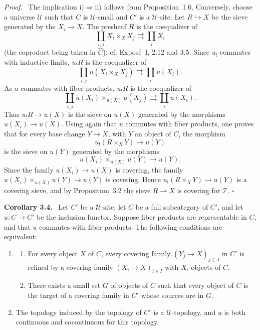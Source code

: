 \documentclass[11pt]{article}
\newcommand{\U}{\mathcal{U}}
\newcommand{\qedtext}{\hfill\(\square\)}
\newenvironment{statement}[1]{\par\medskip\noindent\textbf{#1.}\ }{\par\medskip}
\newenvironment{prooftext}{\par\noindent\emph{Proof.}\ }{\par\medskip}
\begin{document}
\begin{prooftext}
The implication \(\mathrm{i})\Rightarrow\mathrm{ii})\) follows from Proposition~1.6. Conversely, choose a universe \(\U\) such that \(C\) is \(\U\)-small and \(C'\) is a \(\U\)-site. Let \(R\hookrightarrow X\) be the sieve generated by the \(X_i\to X\). The presheaf \(R\) is the coequalizer of
\[
\coprod_{i,j}X_i\times_XX_j\rightrightarrows\coprod_iX_i
\]
(the coproduct being taken in \(\widehat C\)); cf. Expos\'e~I, 2.12 and 3.5. Since \(u_!\) commutes with inductive limits, \(u_!R\) is the coequalizer of
\[
\coprod_{i,j}u(X_i\times_XX_j)\rightrightarrows\coprod_i u(X_i).
\]
As \(u\) commutes with fiber products, \(u_!R\) is the coequalizer of
\[
\coprod_{i,j}u(X_i)\times_{u(X)}u(X_j)\rightrightarrows\coprod_i u(X_i).
\]
Thus \(u_!R\to u(X)\) is the sieve on \(u(X)\) generated by the morphisms \(u(X_i)\to u(X)\). Using again that \(u\) commutes with fiber products, one proves that for every base change \(Y\to X\), with \(Y\) an object of \(C\), the morphism
\[
u_!(R\times_XY)\longrightarrow u(Y)
\]
is the sieve on \(u(Y)\) generated by the morphisms
\[
u(X_i)\times_{u(X)}u(Y)\longrightarrow u(Y).
\]
Since the family \(u(X_i)\to u(X)\) is covering, the family \(u(X_i)\times_{u(X)}u(Y)\to u(Y)\) is covering. Hence \(u_!(R\times_XY)\to u(Y)\) is a covering sieve, and by Proposition~3.2 the sieve \(R\to X\) is covering for \(\mathcal T\). \qedtext
\end{prooftext}

\begin{statement}{Corollary 3.4}
Let \(C'\) be a \(\U\)-site, let \(C\) be a full subcategory of \(C'\), and let \(u:C\to C'\) be the inclusion functor. Suppose fiber products are representable in \(C\), and that \(u\) commutes with fiber products. The following conditions are equivalent:
\begin{enumerate}[label=\roman*)]
\item
\begin{enumerate}[label=\alph*)]
\item For every object \(X\) of \(C\), every covering family \((Y_j\to X)_{j\in J}\) in \(C'\) is refined by a covering family \((X_i\to X)_{i\in I}\) with \(X_i\) objects of \(C\).
\item There exists a small set \(G\) of objects of \(C\) such that every object of \(C\) is the target of a covering family in \(C'\) whose sources are in \(G\).
\end{enumerate}
\item The topology induced by the topology of \(C'\) is a \(\U\)-topology, and \(u\) is both continuous and cocontinuous for this topology.
\end{enumerate}
\end{statement}
\end{document}
